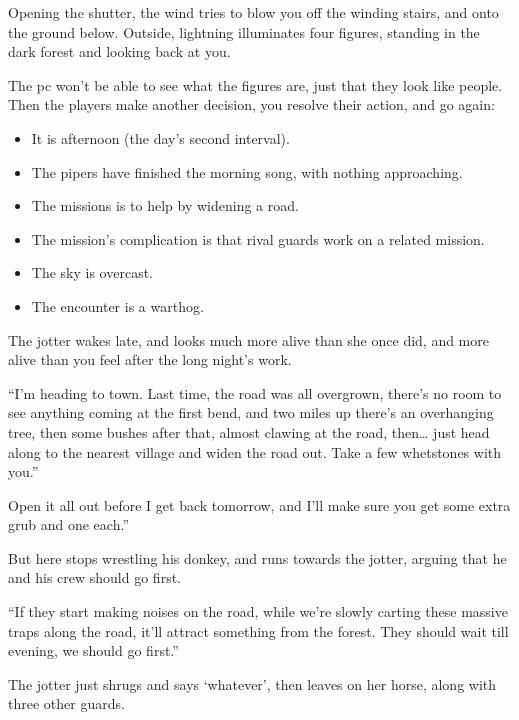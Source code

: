 \begin{multicols}{2}
\begin{boxtext}
  Opening the shutter, the wind tries to blow you off the winding stairs, and onto the ground below.
  Outside, lightning illuminates four figures, standing in the dark forest and looking back at you.
\end{boxtext}

The \gls{pc} won't be able to see what the figures are, just that they look like people.
Then the players make another decision, you resolve their action, and go again:

\begin{itemize}
  \item
  It is afternoon (the day's second \gls{interval}).
  \item
  The pipers have finished the morning song, with nothing approaching.
  \item
  The missions is to help  by widening a road.
  \item
  The mission's complication is that rival \glspl{guard} work on a related mission.
  \item
  The sky is overcast.
  \item
  The encounter is a warthog.
\end{itemize}

\begin{boxtext}
  The \gls{jotter} wakes late, and looks much more alive than she once did, and more alive than you feel after the long night's work.

  ``I'm heading to town.
  Last time, the road was all overgrown, there's no room to see anything coming at the first bend, and two miles up there's an overhanging tree, then some bushes after that, almost clawing at the road, then\ldots
  just head along to the nearest \gls{village} and widen the road out.
  Take a few whetstones with you.''

  Open it all out before I get back tomorrow, and I'll make sure you get some extra grub and one  each.''

  But here  stops wrestling his donkey, and runs towards the \gls{jotter}, arguing that he and his crew should go first.

  ``If they start making noises on the road, while we're slowly carting these massive traps along the road, it'll attract something from the forest.
  They should wait till evening, we should go first.''

  The \gls{jotter} just shrugs and says `whatever', then leaves on her horse, along with three other \glspl{guard}.
\end{boxtext}


\end{multicols}
